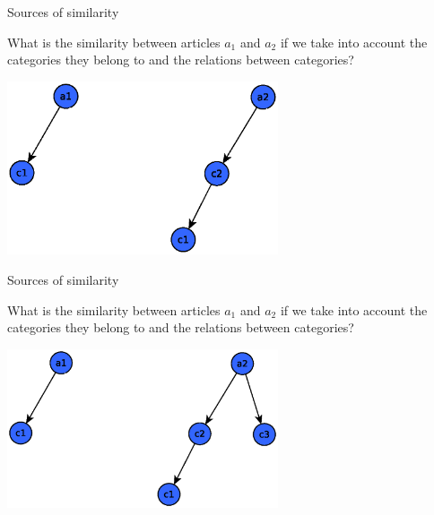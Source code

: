 \documentclass[xcolor=dvipsnames]{beamer}
\begin{document}
\begin{frame}{Sources of similarity}


What is the similarity between articles $a_1$ and $a_2$  if we take into account the categories they belong to and the relations between categories?


\begin{center}

\includegraphics[width=0.6\textwidth, height=0.4\paperheight]{media/sim1.eps}

\end{center}

\end{frame}


\begin{frame}{Sources of similarity}

What is the similarity between articles $a_1$ and $a_2$  if we take into account the categories they belong to and the relations between categories?

\begin{center}

\includegraphics[width=0.6\textwidth, height=0.4\paperheight]{media/sim1.1.eps}

\end{center}

\end{frame}
\end{document}
